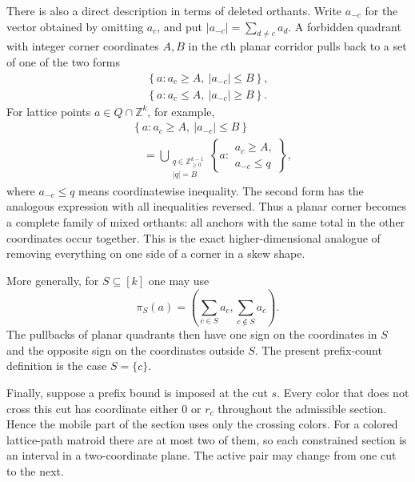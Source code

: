 There is also a direct description in terms of deleted orthants. Write
$a_{-c}$ for the vector obtained by omitting $a_c$, and put
$|a_{-c}|=\sum_{d\neq c}a_d$. A forbidden quadrant with integer corner
coordinates $A,B$ in the $c$th planar corridor pulls back to a set of
one of the two forms
\[
 \begin{gathered}
  \left\{a:a_c\geq A,\ |a_{-c}|\leq B\right\},\\
  \left\{a:a_c\leq A,\ |a_{-c}|\geq B\right\}.
 \end{gathered}
\]
For lattice points $a\in Q\cap\mathbb Z^k$, for example,
\[
 \begin{aligned}
  &\left\{a:a_c\geq A,\ |a_{-c}|\leq B\right\}\\
  &\quad=
  \bigcup_{\substack{q\in\mathbb Z_{\geq0}^{k-1}\\|q|=B}}
  \left\{a:
  \begin{array}{c}
   a_c\geq A,\\[-2pt]
   a_{-c}\leq q
  \end{array}\right\},
 \end{aligned}
\]
where $a_{-c}\leq q$ means coordinatewise inequality. The second form has
the analogous expression with all inequalities reversed. Thus a planar
corner becomes a complete family of mixed orthants:
all anchors with the same total in the other coordinates occur together.
This is the exact higher-dimensional analogue of removing everything on one
side of a corner in a skew shape.

More generally, for $S\subseteq[k]$ one may use
\[
 \pi_S(a)=\left(\sum_{c\in S}a_c,
                    \sum_{c\notin S}a_c\right).
\]
The pullbacks of planar quadrants then have one sign on the coordinates in
$S$ and the opposite sign on the coordinates outside $S$. The present
prefix-count definition is the case $S=\{c\}$.

Finally, suppose a prefix bound is imposed at the cut $s$. Every color that
does not cross this cut has coordinate either $0$ or $r_c$ throughout the
admissible section. Hence the mobile part of the section uses only the
crossing colors. For a colored lattice-path matroid there are at most two of
them, so each constrained section is an interval in a two-coordinate plane.
The active pair may change from one cut to the next.
